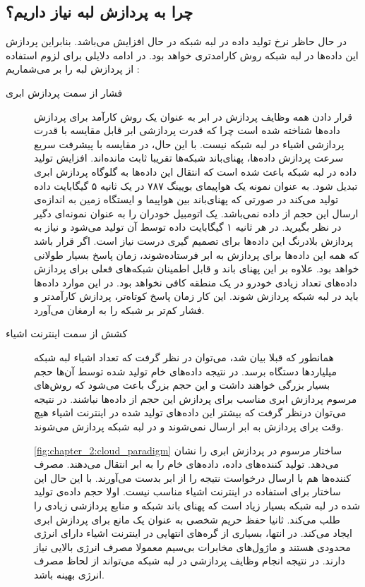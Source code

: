     \subsection{چرا به پردازش لبه نیاز داریم؟}
      در حال حاظر نرخ تولید داده در لبه شبکه در حال افزایش می‌باشد.
      بنابراین پردازش این داده‌ها در لبه شبکه روش کارامدتری خواهد بود.
      در ادامه دلایلی برای لزوم استفاده از پردازش لبه را بر می‌شماریم \cite{shi2016edge}:
      \begin{description}
        \item [فشار از سمت پردازش ابری]
          قرار دادن همه وظایف پردازش در ابر به عنوان یک روش کارآمد برای پردازش داده‌ها شناخته شده است چرا که قدرت پردازشی ابر قابل مقایسه با قدرت پردازشی اشیاء در لبه شبکه نیست.
          با این حال، در مقایسه با پیشرفت سریع سرعت پردازش داده‌ها، پهنای‌باند شبکه‌ها تقریبا ثابت مانده‌اند.
          افزایش تولید داده در لبه شبکه باعث شده است که انتقال این داده‌ها به گلوگاه پردازش ابری تبدیل شود.
          به عنوان نمونه یک هواپیما‌ی بویینگ ۷۸۷ در یک ثانیه ۵ گیگابایت داده تولید می‌کند در صورتی که پهنای‌باند بین هواپیما و ایستگاه زمین به اندازه‌ی ارسال این حجم از داده نمی‌باشد.
          یک اتومبیل خودران را به عنوان نمونه‌ای دگیر در نظر بگیرید.
          در هر ثانیه ۱ گیگابایت داده توسط آن تولید می‌شود و نیاز به پردازش بلادرنگ این داده‌ها برای تصمیم گیری درست نیاز است.
          اگر قرار باشد که همه این داده‌ها برای پردازش به ابر فرستاده‌شوند، زمان پاسخ بسیار طولانی خواهد بود.
          علاوه بر این پهنای باند و قابل اطمینان شبکه‌های فعلی برای پردازش داده‌‌های تعداد زیادی خودرو در یک منطقه کافی نخواهد بود.
          در این موارد داده‌ها باید در لبه شبکه پردازش شوند.
          این کار زمان پاسخ کوتاه‌تر، پردازش کارآمد‌تر و فشار کم‌تر بر شبکه را به ارمغان می‌آورد.

        \item [کشش از سمت اینترنت اشیاء]
          همانطور که قبلا بیان شد، می‌توان در نظر گرفت که تعداد اشیاء لبه شبکه میلیارد‌ها دستگاه برسد.
          در نتیجه داده‌های خام تولید شده توسط آن‌ها حجم بسیار بزرگی خواهند داشت و این حجم بزرگ باعث می‌شود که روش‌های مرسوم پردازش ابری مناسب برای پردازش این حجم از داده‌ها نباشند.
          در نتیجه می‌توان درنظر گرفت که بیشتر این داده‌های تولید شده در اینترنت اشیاء هیچ وقت برای پردازش به ابر ارسال نمی‌شوند و در لبه شبکه پردازش می‌شوند.

          \cref{fig:chapter_2:cloud_paradigm} ساختار مرسوم در پردازش ابری را نشان می‌دهد.
          تولید کننده‌های داده، داده‌های خام را به ابر انتقال می‌دهند.
          مصرف کننده‌ها هم با ارسال درخواست نتیجه را از ابر بدست می‌آورند.
          با این حال این ساختار برای استفاده در اینترنت اشیاء مناسب نیست.
          اولا حجم داده‌ی تولید شده در لبه شبکه بسیار زیاد است که پهنای باند شبکه و منابع پردازشی زیادی را طلب می‌کند.
          ثانیا حفظ حریم شخصی به عنوان یک مانع برای پردازش ابری ایجاد می‌کند.
          در انتها، بسیاری از گره‌های انتهایی در اینترنت اشیاء دارای انرژی محدودی هستند و ماژول‌های مخابرات بی‌سیم معمولا مصرف انرژی بالایی نیاز دارند.
          در نتیجه انجام وظایف پردازشی در لبه شبکه می‌تواند از لحاظ مصرف انرژی بهینه‌ باشد.


\end{description}
